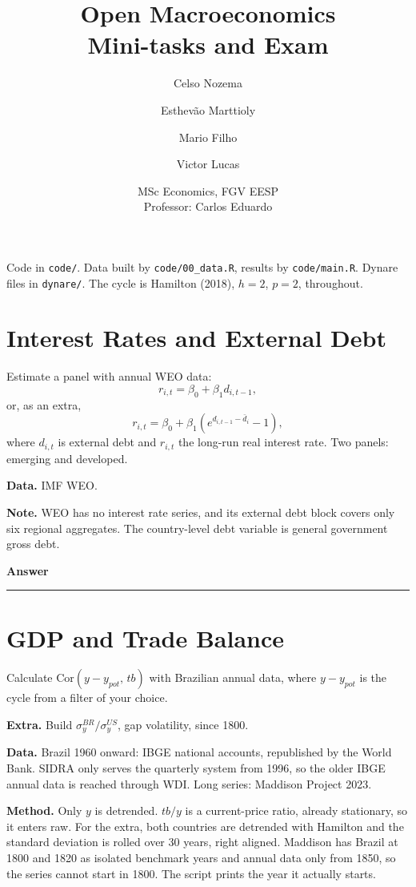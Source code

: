\documentclass[11pt,a4paper]{article}
\title{Open Macroeconomics \\ \large Mini-tasks and Exam}
\author{Celso Nozema \and Esthevão Marttioly \and Mario Filho \and Victor Lucas}
\date{MSc Economics, FGV EESP \\ Professor: Carlos Eduardo}
\newcommand{\note}[2]{\smallskip\noindent\textbf{#1.} #2\par}
\newcommand{\answerspace}[1][6cm]{%
  \smallskip\noindent\textbf{Answer}\par\vspace{2mm}%
  \noindent\rule{\textwidth}{0.4pt}\vspace{#1}\par}
\begin{document}
\maketitle

\noindent
Code in \texttt{code/}. Data built by \texttt{code/00\_data.R}, results by
\texttt{code/main.R}. Dynare files in \texttt{dynare/}.
The cycle is Hamilton (2018), $h=2$, $p=2$, throughout.

\tableofcontents
\newpage


\section{Interest Rates and External Debt}

\begin{question}
Estimate a panel with annual WEO data:
\[ r_{i,t} = \beta_0 + \beta_1 d_{i,t-1}, \]
or, as an extra,
\[ r_{i,t} = \beta_0 + \beta_1 \left( e^{d_{i,t-1} - \bar d_i} - 1 \right), \]
where $d_{i,t}$ is external debt and $r_{i,t}$ the long-run real interest rate.
Two panels: emerging and developed.
\end{question}

\note{Data}{IMF WEO.}
\note{Note}{WEO has no interest rate series, and its external debt block covers
only six regional aggregates. The country-level debt variable is general
government gross debt.}

\answerspace[8cm]


\section{GDP and Trade Balance}

\begin{question}
Calculate $\mathrm{Cor}(y - y_{pot},\, tb)$ with Brazilian annual data, where
$y - y_{pot}$ is the cycle from a filter of your choice.

\smallskip
\textbf{Extra.} Build $\sigma_y^{BR} / \sigma_y^{US}$, gap volatility, since 1800.
\end{question}

\note{Data}{Brazil 1960 onward: IBGE national accounts, republished by the
World Bank. SIDRA only serves the quarterly system from 1996, so the older
IBGE annual data is reached through WDI. Long series: Maddison Project 2023.}

\note{Method}{Only $y$ is detrended. $tb/y$ is a current-price ratio, already
stationary, so it enters raw. For the extra, both countries are detrended with
Hamilton and the standard deviation is rolled over 30 years, right aligned.
Maddison has Brazil at 1800 and 1820 as isolated benchmark years and annual
data only from 1850, so the series cannot start in 1800. The script prints the
year it actually starts.}
\end{document}
